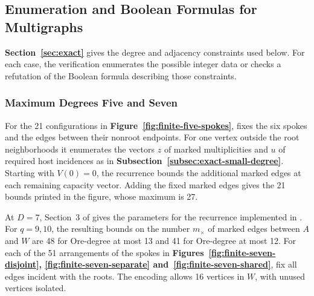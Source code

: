 \subsection{Enumeration and Boolean Formulas for Multigraphs}
\label{app:multi-finite}
\textbf{Section~\ref{sec:exact}} gives the degree and adjacency constraints used below.
For each case, the verification enumerates the possible integer data
or checks a refutation of the Boolean formula describing those
constraints.

\subsubsection{Maximum Degrees Five and Seven}\label{app:multi-low-degree}

For the 21 configurations in \textbf{Figure~\ref{fig:finite-five-spokes}},
 fixes the six spokes and the edges
between their nonroot endpoints. For one vertex outside the root
neighborhoods it enumerates the vectors $z$ of marked multiplicities
and $u$ of required host incidences as in
\textbf{Subsection~\ref{subsec:exact-small-degree}}. Starting with
$V(0)=0$, the recurrence bounds the additional marked edges at each
remaining capacity vector. Adding the fixed marked edges gives the
21 bounds printed in the figure, whose maximum is 27.

At $D=7$, Section~3 of  gives the
parameters for the recurrence implemented in
. For $q=9,10$, the resulting bounds
on the number $m_\times$ of marked edges between $A$ and $W$ are 48
for Ore-degree at most 13 and 41 for Ore-degree at most 12. For each
of the 51 arrangements of the spokes in
\textbf{Figures~\ref{fig:finite-seven-disjoint},
\ref{fig:finite-seven-separate} and~\ref{fig:finite-seven-shared}},
fix all edges incident with the roots. The encoding allows 16 vertices
in $W$, with unused vertices isolated.

